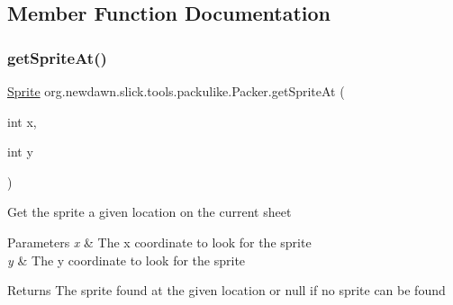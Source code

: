 \subsection{Member Function Documentation}
\mbox{\label{classorg_1_1newdawn_1_1slick_1_1tools_1_1packulike_1_1_packer_a34ac2a1c7cef9dfc9dbef0cd3d636203}} 
\subsubsection{\texorpdfstring{get\+Sprite\+At()}{getSpriteAt()}}
{\footnotesize\ttfamily \mbox{\hyperlink{classorg_1_1newdawn_1_1slick_1_1tools_1_1packulike_1_1_sprite}{Sprite}} org.\+newdawn.\+slick.\+tools.\+packulike.\+Packer.\+get\+Sprite\+At (\begin{DoxyParamCaption}\item[{int}]{x,  }\item[{int}]{y }\end{DoxyParamCaption})\hspace{0.3cm}{\ttfamily [inline]}}

Get the sprite a given location on the current sheet


\begin{DoxyParams}{Parameters}
{\em x} & The x coordinate to look for the sprite \\
\hline
{\em y} & The y coordinate to look for the sprite \\
\hline
\end{DoxyParams}
\begin{DoxyReturn}{Returns}
The sprite found at the given location or null if no sprite can be found 
\end{DoxyReturn}

